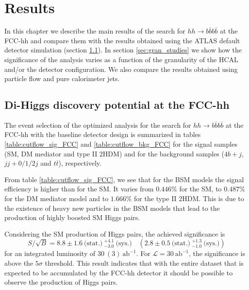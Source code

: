 
\chapter{Results}
\label{chapter:results}

In this chapter we describe the main results of the search for $hh\rightarrow b\overline{b}b\overline{b}$ at the FCC-hh and compare them with the results obtained using the ATLAS default detector simulation (section \ref{sec:dihiggs_FCC}). In section \ref{sec:gran_studies} we show how the significance of the analysis varies as a function of the granularity of the HCAL and/or the detector configuration. We also compare the results obtained using particle flow and pure calorimeter jets.

\section{Di-Higgs discovery potential at the FCC-hh}
\label{sec:dihiggs_FCC}

The event selection of the optimized analysis for the search for $hh\rightarrow b\overline{b}b\overline{b}$ at the FCC-hh with the baseline detector design is summarized in tables \ref{table:cutflow_sig_FCC} and \ref{table:cutflow_bkg_FCC} for the signal samples (SM, DM mediator and type II 2HDM) and for the background samples ($4b+j$, $jj+0/1/2 j$ and $t\overline{t}$), respectively.

From table \ref{table:cutflow_sig_FCC}, we see that for the BSM models the signal efficiency is higher than for the SM. It varies from $0.446\%$ for the SM, to $0.487\%$ for the DM mediator model and to $1.666\%$ for the type II 2HDM. This is due to the existence of heavy new particles in the BSM models that lead to the production of highly boosted SM Higgs pairs.

Considering the SM production of Higgs pairs, the achieved significance is
\begin{equation}
	S/\sqrt{B}=8.8\pm 1.6~\text{(stat.)}~^{+4.1}_{-3.0}~\text{(sys.)}\quad \left(2.8\pm 0.5~\text{(stat.)}~^{+1.3}_{-1.0}~\text{(sys.)}\right)
\end{equation}
for an integrated luminosity of $30~(3)~\text{ab}^{-1}$. For $\mathcal{L}=30~\text{ab}^{-1}$, the significance is above the $5\sigma$ threshold. This result indicates that with the entire dataset that is expected to be accumulated by the FCC-hh detector it should be possible to observe the production of Higgs pairs.

